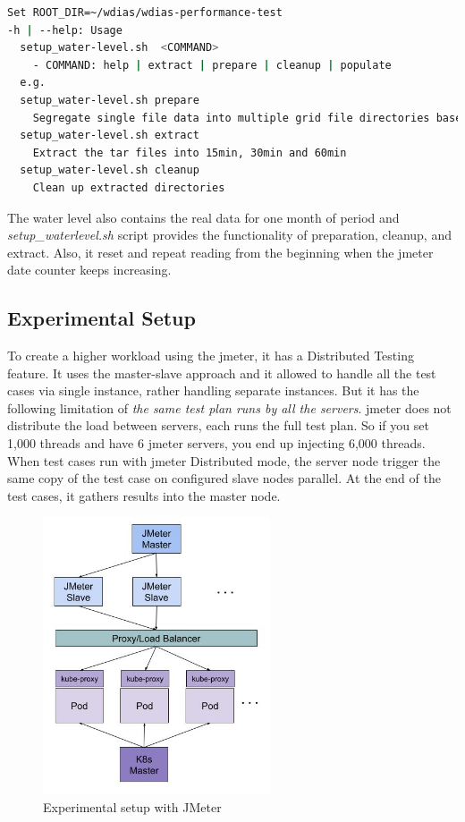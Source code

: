 \begin{lstlisting}[language=sh, caption= Preparation of water-level data.]
Set ROOT_DIR=~/wdias/wdias-performance-test
-h | --help: Usage
  setup_water-level.sh  <COMMAND>
    - COMMAND: help | extract | prepare | cleanup | populate
  e.g.
  setup_water-level.sh prepare
    Segregate single file data into multiple grid file directories based on date. And Separate into main directories of 15min, 30min, 60min and create tar files
  setup_water-level.sh extract
    Extract the tar files into 15min, 30min and 60min
  setup_water-level.sh cleanup
    Clean up extracted directories
\end{lstlisting}
The water level also contains the real data for one month of period and \emph{setup\_waterlevel.sh} script provides the functionality of preparation, cleanup, and extract.
Also, it reset and repeat reading from the beginning when the \acrshort{jmeter} date counter keeps increasing.


\subsection{Experimental Setup}
\label{subse:experimental_setup}

To create a higher workload using the \acrshort{jmeter}, it has a Distributed Testing feature. It uses the master-slave approach and it allowed to handle all the test cases via single instance, rather handling separate instances. But it has the following limitation of \emph{the same test plan runs by all the servers}. \acrshort{jmeter} does not distribute the load between servers, each runs the full test plan. So if you set 1,000 threads and have 6 \acrshort{jmeter} servers, you end up injecting 6,000 threads. When test cases run with \acrshort{jmeter} Distributed mode, the server node trigger the same copy of the test case on configured slave nodes parallel. At the end of the test cases, it gathers results into the master node.

\begin{figure}[htp]
    \centering
    \includegraphics[width=0.6\textwidth]{results/work_load/experimental_setup_v3.jpg}
    \caption{Experimental setup with JMeter}
    \label{fi:experimental_setup}
\end{figure}

